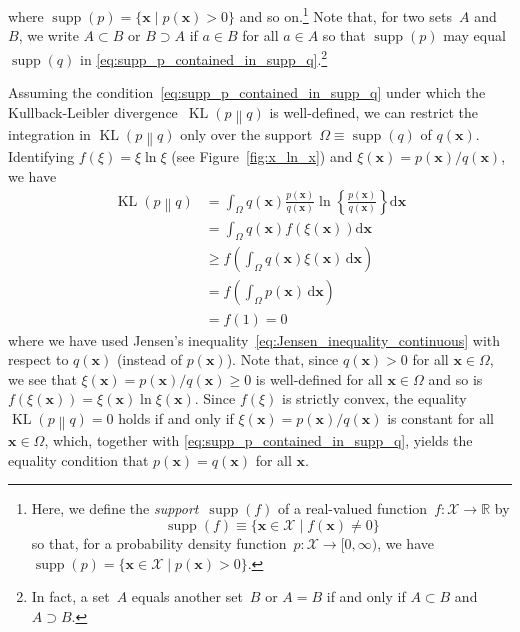 \documentclass[12pt,a4paper]{article}
\begin{document}
where $\operatorname{supp}(p) = \{ \mathbf{x} \mid p(\mathbf{x}) > 0 \}$ and so on.\footnote{%
Here, we define the \emph{support}~$\operatorname{supp}(f)$ of
a real-valued function~$f : \mathcal{X} \to \mathbb{R}$ by
\begin{equation}
\operatorname{supp}(f) \equiv \{ \mathbf{x} \in \mathcal{X} \mid f(\mathbf{x}) \neq 0 \}
\end{equation}
so that, for a probability density function~$p : \mathcal{X} \to [0, \infty)$, we have
$\operatorname{supp}(p) = \{ \mathbf{x} \in \mathcal{X} \mid p(\mathbf{x}) > 0 \}$.}
Note that, for two sets~$A$ and $B$,
we write $A \subset B$ or $B \supset A$ if $a \in B$ for all $a \in A$
so that $\operatorname{supp}(p)$ may equal $\operatorname{supp}(q)$ in
\eqref{eq:supp_p_contained_in_supp_q}.\footnote{%
In fact, a set~$A$ equals another set~$B$ or $A = B$
if and only if $A \subset B$ and $A \supset B$.}

Assuming the condition~\eqref{eq:supp_p_contained_in_supp_q} under which
the Kullback-Leibler divergence~$\operatorname{KL}\left( p \middle\| q \right)$
is well-defined,
we can restrict the integration in $\operatorname{KL}\left( p \middle\| q \right)$
only over the support~$\Omega \equiv \operatorname{supp}(q)$ of $q(\mathbf{x})$.
Identifying $f(\xi) = \xi\ln\xi$ (see Figure~\ref{fig:x_ln_x}) and
$\xi(\mathbf{x}) = p(\mathbf{x})/q(\mathbf{x})$,
we have
\begin{align}
\operatorname{KL}\left( p \middle\| q \right)
&= \int_{\Omega} q(\mathbf{x})
\frac{p(\mathbf{x})}{q(\mathbf{x})}
\ln \left\{\frac{p(\mathbf{x})}{q(\mathbf{x})}\right\}
\mathrm{d}\mathbf{x} \\
&= \int_{\Omega} q(\mathbf{x})
f\left(\xi(\mathbf{x})\right)
\mathrm{d}\mathbf{x} \\
&\geqslant f\left(
\int_{\Omega} q(\mathbf{x}) \xi(\mathbf{x}) \, \mathrm{d}\mathbf{x}
\right) \\
&= f\left(\int_{\Omega} p(\mathbf{x}) \, \mathrm{d}\mathbf{x} \right) \\
&= f(1) = 0
\end{align}
where we have used Jensen's inequality~\eqref{eq:Jensen_inequality_continuous}
with respect to $q(\mathbf{x})$ (instead of $p(\mathbf{x})$).
Note that, since $q(\mathbf{x}) > 0$ for all $\mathbf{x} \in \Omega$, we see that
$\xi(\mathbf{x}) = p(\mathbf{x})/q(\mathbf{x}) \geqslant 0$ is well-defined
for all $\mathbf{x} \in \Omega$ and
so is $f\left(\xi(\mathbf{x})\right) = \xi(\mathbf{x})\ln\xi(\mathbf{x})$.
Since $f(\xi)$ is strictly convex,
the equality~$\operatorname{KL}\left( p \middle\| q \right) = 0$ holds if and only if
$\xi(\mathbf{x}) = p(\mathbf{x})/q(\mathbf{x})$ is constant for all $\mathbf{x} \in \Omega$,
which, together with \eqref{eq:supp_p_contained_in_supp_q}, yields the equality condition that
$p(\mathbf{x}) = q(\mathbf{x})$ for all $\mathbf{x}$.
\end{document}
